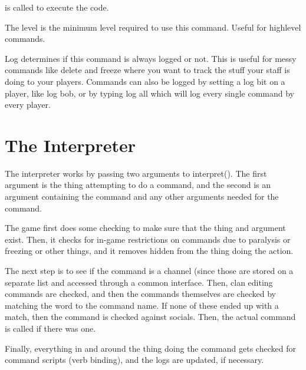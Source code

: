 is called to execute the code.

The level is the minimum level required to use this command. Useful
for highlevel commands.

Log determines if this command is always logged or not. This is useful
for messy commands like delete and freeze where you want to track the
stuff your staff is doing to your players. Commands can also be logged
by setting a log bit on a player, like log bob, or by typing log all
which will log every single command by every player.


\section{The Interpreter}

The interpreter works by passing two arguments to interpret(). The
first argument is the thing attempting to do a command, and the second
is an argument containing the command and any other arguments needed
for the command.


The game first does some checking to make sure that the thing and
argument exist. Then, it checks for in-game restrictions on commands
due to paralysis or freezing or other things, and it removes hidden
from the thing doing the action.


The next step is to see if the command is a channel (since those are
stored on a separate list and accessed through a common interface.
Then, clan editing commands are checked, and then the commands
themselves are checked by matching the word to the command name.
If none of these ended up with a match, then the command is checked
against socials. Then, the actual command is called if there was one.


Finally, everything in and around the thing doing the command gets
checked for command scripts (verb binding), and the logs are updated,
if necessary.





















